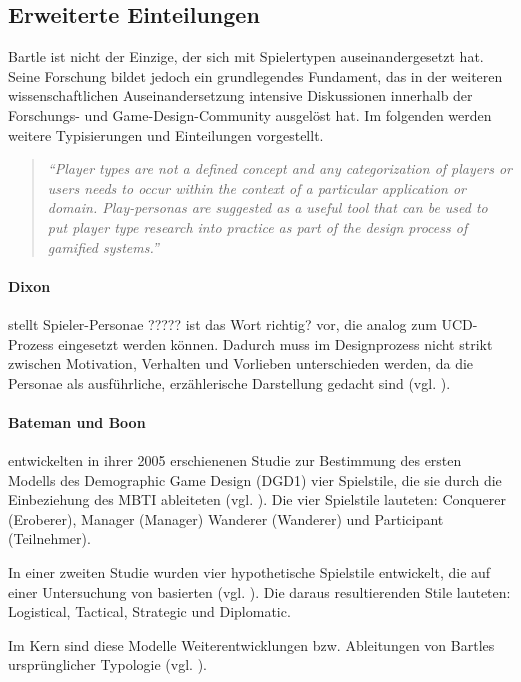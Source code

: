 \subsection{Erweiterte Einteilungen}
Bartle ist nicht der Einzige, der sich mit Spielertypen auseinandergesetzt hat. Seine Forschung bildet jedoch ein grundlegendes Fundament, das in der weiteren wissenschaftlichen Auseinandersetzung intensive Diskussionen innerhalb der Forschungs- und Game-Design-Community ausgelöst hat. Im folgenden werden weitere Typisierungen und Einteilungen vorgestellt.
\begin{quote}
    \textit{
        \enquote{Player types are not a defined concept and any categorization of players or users needs to occur within the context of a particular application or domain. Play-personas are suggested as a useful tool that can be used to put player type research into practice as part of the design process of gamified systems.}
    } 
    \cite{dixon_player_nodate}
\end{quote}

\paragraph{Dixon} 
stellt Spieler-Personae ????? ist das Wort richtig?  vor, die analog zum \ac{UCD}-Prozess eingesetzt werden können. Dadurch muss im Designprozess nicht strikt zwischen Motivation, Verhalten und Vorlieben unterschieden werden, da die Personae als ausführliche, erzählerische Darstellung gedacht sind (vgl. \citealp{dixon_player_nodate}).

\paragraph{Bateman und Boon}
entwickelten in ihrer 2005 erschienenen Studie zur Bestimmung des ersten Modells des Demographic Game Design (DGD1) vier Spielstile, die sie durch die Einbeziehung des \ac{MBTI} ableiteten (vgl. \citealp{noauthor_mbti_nodate, bateman_21st_2005}).
Die vier Spielstile lauteten: Conquerer (Eroberer), Manager (Manager) Wanderer (Wanderer) und Participant (Teilnehmer).

In einer zweiten Studie wurden vier hypothetische Spielstile entwickelt, die auf einer Untersuchung von \cite{berens_understanding_2000} basierten (vgl. \citealp{bateman_player_2012}). Die daraus resultierenden Stile lauteten: Logistical, Tactical, Strategic und Diplomatic.

Im Kern sind diese Modelle Weiterentwicklungen bzw. Ableitungen von Bartles ursprünglicher Typologie (vgl. \citealp{institut_fur_ludologie_spielertypen_nodate}).

